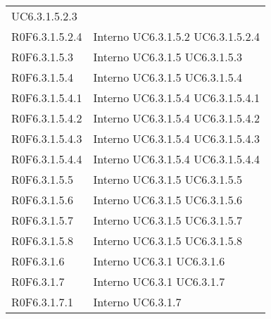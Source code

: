 \begin{longtable}{p{2.5cm}!{\VRule[1pt]}p{2.5cm}}
 \newline UC6.3.1.5.2.3
 \\
R0F6.3.1.5.2.4 & Interno \newline UC6.3.1.5.2
 \newline UC6.3.1.5.2.4
 \\
R0F6.3.1.5.3 & Interno \newline UC6.3.1.5
 \newline UC6.3.1.5.3
 \\
R0F6.3.1.5.4 & Interno \newline UC6.3.1.5
 \newline UC6.3.1.5.4
 \\
R0F6.3.1.5.4.1 & Interno \newline UC6.3.1.5.4
 \newline UC6.3.1.5.4.1
 \\
R0F6.3.1.5.4.2 & Interno \newline UC6.3.1.5.4
 \newline UC6.3.1.5.4.2
 \\
R0F6.3.1.5.4.3 & Interno \newline UC6.3.1.5.4
 \newline UC6.3.1.5.4.3
 \\
R0F6.3.1.5.4.4 & Interno \newline UC6.3.1.5.4
 \newline UC6.3.1.5.4.4
 \\
R0F6.3.1.5.5 & Interno \newline UC6.3.1.5
 \newline UC6.3.1.5.5
 \\
R0F6.3.1.5.6 & Interno \newline UC6.3.1.5
 \newline UC6.3.1.5.6
 \\
R0F6.3.1.5.7 & Interno \newline UC6.3.1.5
 \newline UC6.3.1.5.7
 \\
R0F6.3.1.5.8 & Interno \newline UC6.3.1.5
 \newline UC6.3.1.5.8
 \\
R0F6.3.1.6 & Interno \newline UC6.3.1
 \newline UC6.3.1.6
 \\
R0F6.3.1.7 & Interno \newline UC6.3.1
 \newline UC6.3.1.7
 \\
R0F6.3.1.7.1 & Interno \newline UC6.3.1.7

\end{longtable}
